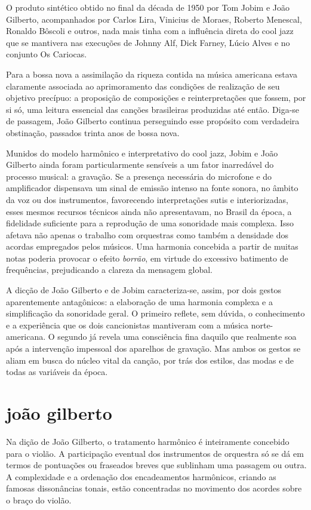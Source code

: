 O produto sintético obtido no final da década de 1950 por Tom Jobim e João
Gilberto, acompanhados por Carlos Lira, Vinicius de Moraes, Roberto
Menescal, Ronaldo Bôscoli e outros, nada mais tinha com a influência
direta do cool jazz que se mantivera nas execuções de Johnny Alf, Dick
Farney, Lúcio Alves e no conjunto Os Cariocas.

Para a bossa nova a assimilação da riqueza contida na música americana
estava claramente associada ao aprimoramento das condições de realização
de seu objetivo precípuo: a proposição de composições e reinterpretações
que fossem, por si só, uma leitura essencial das canções brasileiras
produzidas até então. Diga-se de passagem, João Gilberto continua
perseguindo esse propósito com verdadeira obstinação, passados trinta
anos de bossa nova.

Munidos do modelo harmônico e interpretativo do cool jazz, Jobim e João
Gilberto ainda foram particularmente sensíveis a um fator inarredável do
processo musical: a gravação. Se a presença necessária do microfone e do
amplificador dispensava um sinal de emissão intenso na fonte sonora, no
âmbito da voz ou dos instrumentos, favorecendo interpretações sutis e
interiorizadas, esses mesmos recursos técnicos ainda não apresentavam,
no Brasil da época, a fidelidade suficiente para a reprodução de uma
sonoridade mais complexa. Isso afetava não apenas o trabalho com
orquestras como também a densidade dos acordas empregados pelos músicos.
Uma harmonia concebida a partir de muitas notas poderia provocar o
efeito \textit{borrão}, em virtude do excessivo batimento de frequências,
prejudicando a clareza da mensagem global.

A dicção de João Gilberto e de Jobim caracteriza-se, assim, por dois
gestos aparentemente antagônicos: a elaboração de uma harmonia complexa
e a simplificação da sonoridade geral. O primeiro reflete, sem dúvida, o
conhecimento e a experiência que os dois cancionistas mantiveram com a
música norte-americana. O segundo já revela uma consciência fina daquilo
que realmente soa após a intervenção impessoal dos aparelhos de
gravação. Mas ambos os gestos se aliam em busca do núcleo vital da
canção, por trás dos estilos, das modas e de todas as variáveis da
época.

\section{joão gilberto}

Na dição de João Gilberto, o tratamento harmônico é inteiramente
concebido para o violão. A participação eventual dos instrumentos de
orquestra só se dá em termos de pontuações ou fraseados breves que
sublinham uma passagem ou outra. A complexidade e a ordenação dos
encadeamentos harmônicos, criando as famosas dissonâncias tonais, estão
concentradas no movimento dos acordes sobre o braço do violão.

